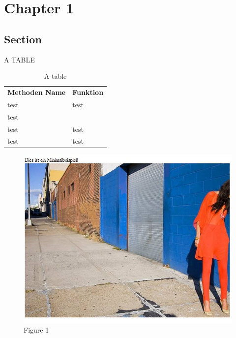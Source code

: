 \chapter{Chapter 1}


\section{Section}

A TABLE

\begin{table}[h]
\centering


\begin{tabularx}{\textwidth}{|lX|}
\hline
\rowcolor{gray!50} \textbf{Methoden Name} & \textbf{Funktion} \\ 
test & test \\ 
test \\ \hline
test & test \\ 
test & test \\ 
\hline
\end{tabularx}
\caption{A table}
\label{tab:table1}
\end{table}


\lstset{language=PHP}


\begin{figure}[h]
\centering
\includegraphics[width=\textwidth]{images/abt1_webseite.jpg}
\caption{Figure 1}
\end{figure}


